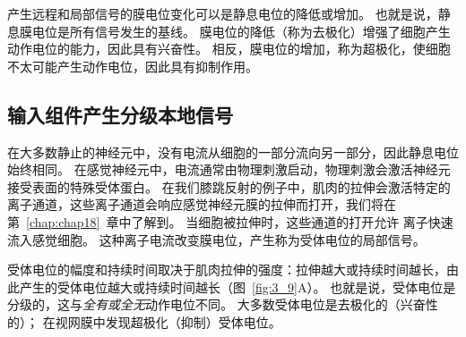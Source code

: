 产生远程和局部信号的膜电位变化可以是静息电位的降低或增加。 
也就是说，静息膜电位是所有信号发生的基线。 
膜电位的降低（称为去极化）增强了细胞产生动作电位的能力，因此具有兴奋性。 
相反，膜电位的增加，称为超极化，使细胞不太可能产生动作电位，因此具有抑制作用。


\subsection{输入组件产生分级本地信号}
在大多数静止的神经元中，没有电流从细胞的一部分流向另一部分，因此静息电位始终相同。 
在感觉神经元中，电流通常由物理刺激启动，物理刺激会激活神经元接受表面的特殊受体蛋白。 
在我们膝跳反射的例子中，肌肉的拉伸会激活特定的离子通道，这些离子通道会响应感觉神经元膜的拉伸而打开，我们将在第~\ref{chap:chap18}~章中了解到。
当细胞被拉伸时，这些通道的打开允许  离子快速流入感觉细胞。 
这种离子电流改变膜电位，产生称为受体电位的局部信号。


受体电位的幅度和持续时间取决于肌肉拉伸的强度：拉伸越大或持续时间越长，由此产生的受体电位越大或持续时间越长（图~\ref{fig:3_9}A）。
也就是说，受体电位是分级的，这与\textit{全有或全无}动作电位不同。
大多数受体电位是去极化的（兴奋性的）；
在视网膜中发现超极化（抑制）受体电位。


